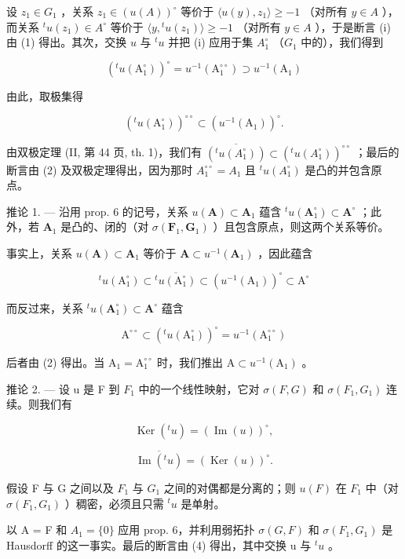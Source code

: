 设 \(z_{1} \in G_{1}\) ，关系 \(z_{1} \in (u(A))^{\circ}\) 等价于 \(\langle u(y), z_{1} \rangle \geqslant -1\) （对所有 \(y \in A\) ），而关系 \({}^{t}u(z_{1}) \in A^{\circ}\) 等价于 \(\langle y, {}^{t}u(z_{1}) \rangle \geqslant -1\) （对所有 \(y \in A\) ），于是断言 (i) 由 (1) 得出。其次，交换 \(u\) 与 \({}^{t}u\) 并把 (i) 应用于集 \(A_{1}^{\circ}\) （\(G_{1}\) 中的），我们得到

\[
\left(^ {t} u \left(\mathrm{A} _ {1} ^ {\circ}\right)\right) ^ {\circ} = u ^ {- 1} \left(\mathrm{A} _ {1} ^ {\circ \circ}\right) \supset u ^ {- 1} \left(\mathrm{A} _ {1}\right)\tag{2}
\]

由此，取极集得

\[
\left(^ {t} u \left(\mathrm{A} _ {1} ^ {\circ}\right)\right) ^ {\circ \circ} \subset \left(u ^ {- 1} \left(\mathrm{A} _ {1}\right)\right) ^ {\circ}.
\]

由双极定理 (II, 第 44 页, th. 1)，我们有 \(\overline{(^t u(A_1^\circ))} \subset (^{t}u(A_1^\circ))^{\circ \circ}\) ；最后的断言由 (2) 及双极定理得出，因为那时 \(A_1^{\circ \circ} = A_1\) 且 \(^t u(A_1^\circ)\) 是凸的并包含原点。

推论 1. --- 沿用 prop. 6 的记号，关系 \(u(\mathbf{A}) \subset \mathbf{A}_1\) 蕴含 \(^t u(\mathbf{A}_1^\circ) \subset \mathbf{A}^\circ\) ；此外，若 \(\mathbf{A}_1\) 是凸的、闭的（对 \(\sigma(\mathbf{F}_1, \mathbf{G}_1)\) ）且包含原点，则这两个关系等价。

事实上，关系 \(u(\mathbf{A}) \subset \mathbf{A}_1\) 等价于 \(\mathbf{A} \subset u^{-1}(\mathbf{A}_1)\) ，因此蕴含

\[
{ } ^ { t } u ( \mathrm{A} _ { 1 } ^ { \circ } ) \subset \overline { { { ^ { t } u ( \mathrm{A} _ { 1 } ^ { \circ } ) } } } \subset ( u ^ { - 1 } ( \mathrm{A} _ { 1 } ) ) ^ { \circ } \subset \mathrm{A} ^ { \circ }
\]

而反过来，关系 \({}^t u(\mathbf{A}_1^\circ) \subset \mathbf{A}^\circ\) 蕴含

\[
\mathrm{A} ^ {\circ \circ} \subset \left(^ {t} u (\mathrm{A} _ {1} ^ {\circ})\right) ^ {\circ} = u ^ {- 1} (\mathrm{A} _ {1} ^ {\circ \circ})
\]

后者由 (2) 得出。当 \(\mathrm{A}_1 = \mathrm{A}_1^{\circ \circ}\) 时，我们推出 \(\mathrm{A} \subset u^{-1}(\mathrm{A}_1)\) 。

推论 2. --- 设 u 是 F 到 \(F_{1}\) 中的一个线性映射，它对 \(\sigma(F, G)\) 和 \(\sigma(F_{1}, G_{1})\) 连续。则我们有

\[
\operatorname{Ker} (^ {t} u) = (\operatorname{Im} (u)) ^ {\circ},\tag{3}
\]

\[
\overline {{\operatorname{Im} (^ {t} u)}} = (\operatorname{Ker} (u)) ^ {\circ}.\tag{4}
\]

假设 F 与 G 之间以及 \(F_{1}\) 与 \(G_{1}\) 之间的对偶都是分离的；则 \(u(F)\) 在 \(F_{1}\) 中（对 \(\sigma(F_{1}, G_{1})\) ）稠密，必须且只需 \(^{t}u\) 是单射。

以 A = F 和 \(A_{1} = \{0\}\) 应用 prop. 6，并利用弱拓扑 \(\sigma(G, F)\) 和 \(\sigma(F_{1}, G_{1})\) 是 Hausdorff 的这一事实。最后的断言由 (4) 得出，其中交换 u 与 \(^{t}u\) 。
